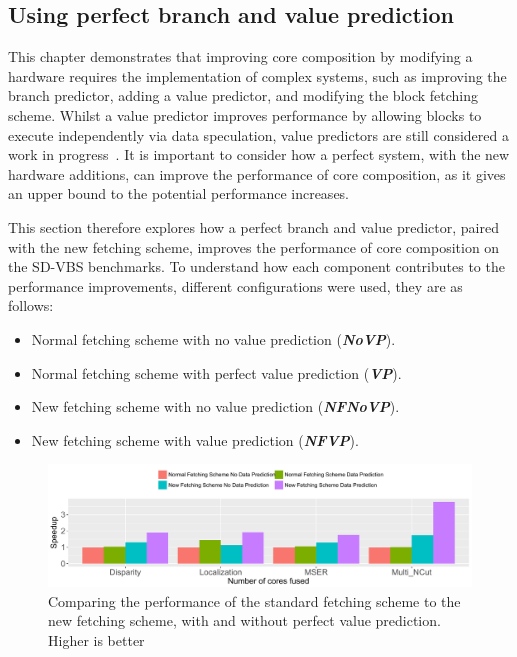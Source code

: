 

\subsection{Using perfect branch and value prediction}
This chapter demonstrates that improving core composition by modifying a hardware requires the implementation of complex systems, such as improving the branch predictor, adding a value predictor, and modifying the block fetching scheme.
Whilst a value predictor improves performance by allowing blocks to execute independently via data speculation, value predictors are still considered a work in progress~\cite{peraisBeBop2015}.
It is important to consider how a perfect system, with the new hardware additions, can improve the performance of core composition, as it gives an upper bound to the potential performance increases.

This section therefore explores how a perfect branch and value predictor, paired with the new fetching scheme, improves the performance of core composition on the SD-VBS benchmarks.
To understand how each component contributes to the performance improvements, different configurations were used, they are as follows:
\begin{itemize}
\item Normal fetching scheme with no value prediction (\textbf{\textit{NoVP}}).
\vspace{-1em}
\item Normal fetching scheme with perfect value prediction (\textbf{\textit{VP}}).
\vspace{-1em}
\item New fetching scheme with no value prediction (\textbf{\textit{NFNoVP}}).
\vspace{-1em}
\item New fetching scheme with value prediction (\textbf{\textit{NFVP}}).
\end{itemize}


\begin{figure}[t]
    \centering
    \includegraphics[width=1\textwidth]{chapter3/graphics/tempres.pdf}
    \caption{Comparing the performance of the standard fetching scheme to the new fetching scheme, with and without perfect value prediction. Higher is better}
    \label{fig:perf_pred}
	\vspace{1em}
\end{figure}

